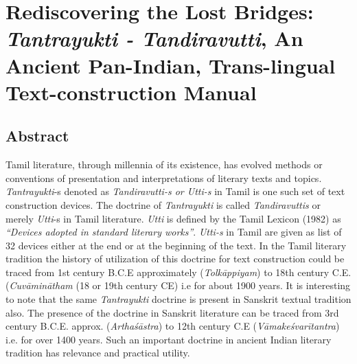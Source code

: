 
\chapter{Rediscovering the Lost Bridges: \textit{Tantrayukti - Tandiravutti}, An Ancient Pan-Indian, Trans-lingual Text-construction Manual}\label{chapter3}



\section*{Abstract}

Tamil literature, through millennia of its existence, has evolved methods or conventions of presentation and interpretations of literary texts and topics. \textit{Tantrayukti}-s denoted as \textit{Tandiravutti-s or Utti-s} in Tamil is one such set of text construction devices. The doctrine of \textit{Tantrayukti} is called \textit{Tandiravuttis} or merely \textit{Utti}-s in Tamil literature. \textit{Utti} is defined by the Tamil Lexicon (1982) as \textit{“Devices adopted in standard literary works”}. \textit{Utti-s} in Tamil are given as list of 32 devices either at the end or at the beginning of the text. In the Tamil literary tradition the history of utilization of this doctrine for text construction could be traced from 1st century B.C.E approximately (\textit{Tolkāppiyam}) to 18th century C.E. (\textit{Cuvāminātham} (18 or 19th century CE) i.e for about 1900 years. It is interesting to note that the same \textit{Tantrayukti} doctrine is present in Sanskrit textual tradition also. The presence of the doctrine in Sanskrit literature can be traced from 3rd century B.C.E. approx. (\textit{Arthaśāstra}) to 12th century C.E (\textit{Vāmakeśvarītantra}) i.e. for over 1400 years. Such an important doctrine in ancient Indian literary tradition has relevance and practical utility.

